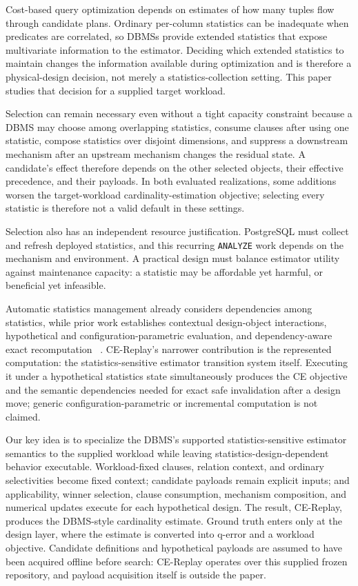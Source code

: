 \documentclass[sigconf,nonacm]{acmart}
\begin{document}
Cost-based query optimization depends on estimates of how many tuples flow through candidate plans. Ordinary per-column statistics can be inadequate when predicates are correlated, so DBMSs provide extended statistics that expose multivariate information to the estimator. Deciding which extended statistics to maintain changes the information available during optimization and is therefore a physical-design decision, not merely a statistics-collection setting. This paper studies that decision for a supplied target workload.

Selection can remain necessary even without a tight capacity constraint because a DBMS may choose among overlapping statistics, consume clauses after using one statistic, compose statistics over disjoint dimensions, and suppress a downstream mechanism after an upstream mechanism changes the residual state. A candidate's effect therefore depends on the other selected objects, their effective precedence, and their payloads. In both evaluated realizations, some additions worsen the target-workload cardinality-estimation objective; selecting every statistic is therefore not a valid default in these settings.

Selection also has an independent resource justification. PostgreSQL must collect and refresh deployed statistics, and this recurring \texttt{ANALYZE} work depends on the mechanism and environment. A practical design must balance estimator utility against maintenance capacity: a statistic may be affordable yet harmful, or beneficial yet infeasible.

Automatic statistics management already considers dependencies among statistics, while prior work establishes contextual design-object interactions, hypothetical and configuration-parametric evaluation, and dependency-aware exact recomputation ~\cite{chaudhuri2001statistics,schnaitter2009interactions,chaudhuri1998whatif,papadomanolakis2007inum,bruno2008cpqo,liu2016incremental}. CE-Replay's narrower contribution is the represented computation: the statistics-sensitive estimator transition system itself. Executing it under a hypothetical statistics state simultaneously produces the CE objective and the semantic dependencies needed for exact safe invalidation after a design move; generic configuration-parametric or incremental computation is not claimed.

Our key idea is to specialize the DBMS's supported statistics-sensitive estimator semantics to the supplied workload while leaving statistics-design-dependent behavior executable. Workload-fixed clauses, relation context, and ordinary selectivities become fixed context; candidate payloads remain explicit inputs; and applicability, winner selection, clause consumption, mechanism composition, and numerical updates execute for each hypothetical design. The result, CE-Replay, produces the DBMS-style cardinality estimate. Ground truth enters only at the design layer, where the estimate is converted into q-error and a workload objective. Candidate definitions and hypothetical payloads are assumed to have been acquired offline before search: CE-Replay operates over this supplied frozen repository, and payload acquisition itself is outside the paper.
\end{document}
